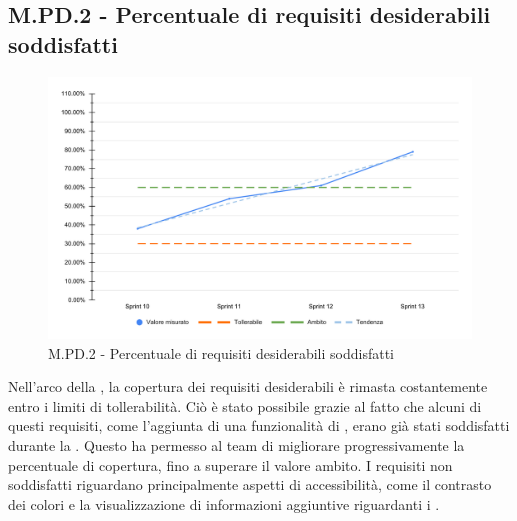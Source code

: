 \subsection{M.PD.2 - Percentuale di requisiti desiderabili soddisfatti}

\begin{figure}[H]
    \centering
    \includegraphics[width=\textwidth]{assets/requisiti_desiderabili_soddisfatti.pdf}
    \caption{M.PD.2 - Percentuale di requisiti desiderabili soddisfatti}
\end{figure}

\par Nell'arco della , la copertura dei requisiti desiderabili è rimasta costantemente entro i limiti di tollerabilità. Ciò è stato possibile grazie al fatto che alcuni di questi requisiti, come l'aggiunta di una funzionalità di , erano già stati soddisfatti durante la . Questo ha permesso al team di migliorare progressivamente la percentuale di copertura, fino a superare il valore ambito. I requisiti non soddisfatti riguardano principalmente aspetti di accessibilità, come il contrasto dei colori e la visualizzazione di informazioni aggiuntive riguardanti i .